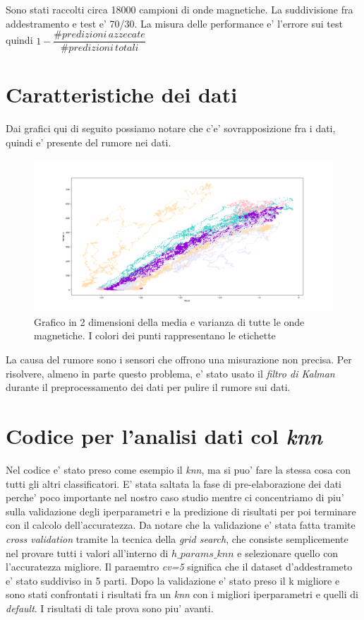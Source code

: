 Sono stati raccolti circa 18000 campioni di onde magnetiche. La suddivisione fra addestramento e test e' 70/30. La misura delle performance e' l'errore sui test quindi  $1 - \dfrac{\# predizioni\, azzecate}{\# predizioni\,totali}$

\section{Caratteristiche dei dati}
Dai grafici qui di seguito possiamo notare che c'e' sovrapposizione fra i dati, quindi e' presente del rumore nei dati.
\begin{figure}[H]
	\centering
	\includegraphics[width=1\linewidth]{img/plot_features}
	\caption{Grafico in 2 dimensioni della media e varianza di tutte le onde magnetiche. I colori dei punti rappresentano le etichette}
	\label{fig:plotfeatures}
\end{figure}

La causa del rumore sono i sensori che offrono una misurazione non precisa. Per risolvere, almeno in parte questo problema, e' stato usato il \textit{filtro di Kalman} durante il preprocessamento dei dati per pulire il rumore sui dati.

\section{Codice per l'analisi dati col \textit{knn}}

Nel codice e' stato preso come esempio il \textit{knn}, ma si puo' fare la stessa cosa con tutti gli altri classificatori. E' stata saltata la fase di pre-elaborazione dei dati perche' poco importante nel nostro caso studio mentre ci concentriamo di piu' sulla validazione degli iperparametri e la predizione di risultati per poi terminare con il calcolo dell'accuratezza. Da notare che la validazione e' stata fatta tramite \textit{cross validation} tramite la tecnica della \textit{grid search}, che consiste semplicemente nel provare tutti i valori all'interno di \textit{$h\_params\_knn$} e selezionare quello con l'accuratezza migliore. Il paraemtro \textit{cv=5} significa che il dataset d'addestrameto e' stato suddiviso in 5 parti. Dopo la validazione e' stato preso il k migliore e sono stati confrontati i risultati fra un \textit{knn} con i migliori iperparametri e quelli di \textit{default}. I risultati di tale prova sono piu' avanti.


